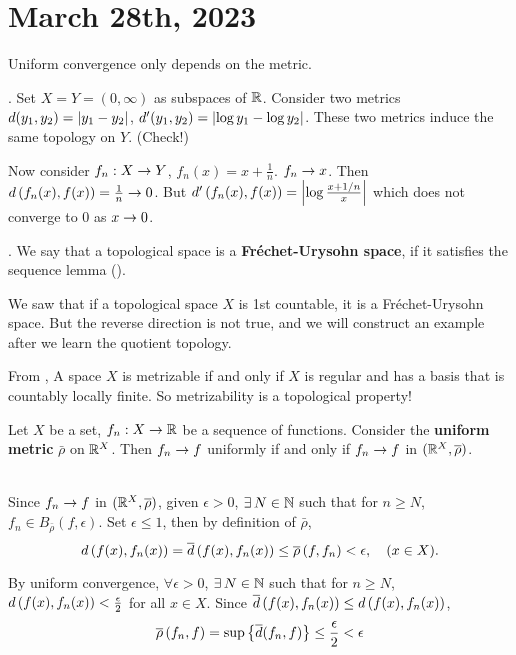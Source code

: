 \section*{March 28th, 2023}

Uniform convergence only depends on the metric.

\ex. Set \(X = Y = (0, \infty)\) as subspaces of \(\mathbb{R}\). Consider two metrics \(d(y_1, y_2) = \left| y_1 - y_2 \right|\), \(d'(y_1, y_2) = \left| \log y_1 - \log y_2 \right|\). These two metrics induce the same topology on \(Y\). (Check!)

Now consider \(f_n : X \rightarrow Y\), \(f_n(x) = x + \frac{1}{n}\). \(f_n \rightarrow x\). Then \(d\left( f_n(x), f(x) \right) = \frac{1}{n} \rightarrow 0\). But \(d'\left( f_n(x), f(x) \right) = \left| \log\frac{x + 1/n}{x} \right|\) which does not converge to 0 as \(x \rightarrow 0\).

. We say that a topological space is a \textbf{Fréchet-Urysohn space}, if it satisfies the sequence lemma ().

\rmk We saw that if a topological space \(X\) is 1st countable, it is a Fréchet-Urysohn space. But the reverse direction is not true, and we will construct an example after we learn the quotient topology.

\rmk From  , A space \(X\) is metrizable if and only if \(X\) is regular and has a basis that is countably locally finite. So metrizability is a topological property!

\rmk Let \(X\) be a set, \(f_n : X \rightarrow \mathbb{R}\) be a sequence of functions. Consider the \textbf{uniform metric} \(\bar{\rho}\) on \(\mathbb{R}^X\). Then \(f_n \rightarrow f\) uniformly if and only if \(f_n \rightarrow f\) in \((\mathbb{R}^X, \overline{\rho})\).

\pf \\
\note{\mimpd} Since \(f_n \rightarrow f\) in \((\mathbb{R}^X, \overline{\rho})\), given \(\epsilon > 0\), \(\exists N \in \N\) such that for \(n \geq N\), \(f_n \in B_{\bar{\rho}}(f, \epsilon)\). Set \(\epsilon \leq 1\), then by definition of \(\bar{\rho}\),
\[
    d\left( f(x), f_n(x) \right)= \overline{d}\left( f(x), f_n(x) \right) \leq \overline{\rho}\left( f, f_n \right) < \epsilon, \quad (x \in X).
\]

\note{\mimp} By uniform convergence, \(\forall \epsilon > 0\), \(\exists N \in \N\) such that for \(n \geq N\), \(d\left( f(x), f_n(x) \right) < \frac{\epsilon}{2}\) for all \(x \in X\). Since \(\overline{d}\left( f(x), f_n(x) \right) \leq d\left( f(x), f_n(x) \right)\),
\[
    \overline{\rho}\left( f_n, f \right) = \sup\left\{\overline{d}(f_n, f)\right\} \leq \frac{\epsilon}{2} < \epsilon
\]

